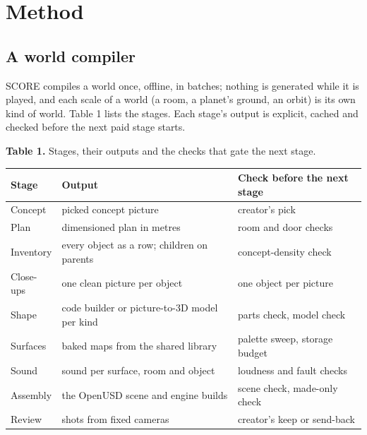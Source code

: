 \section{Method}\label{method}

\subsection{A world compiler}\label{a-world-compiler}

SCORE compiles a world once, offline, in batches; nothing is generated while it is played, and each scale of a world (a room, a planet's ground, an orbit) is its own kind of world. Table 1 lists the stages. Each stage's output is explicit, cached and checked before the next paid stage starts.

\textbf{Table 1.} Stages, their outputs and the checks that gate the next stage.

{\def\LTcaptype{none} %
\begin{longtable}[]{@{}
  >{\raggedright\arraybackslash}p{}
  >{\raggedright\arraybackslash}p{}
  >{\raggedright\arraybackslash}p{}@{}}
\toprule\noalign{}
\begin{minipage}[b]{\linewidth}\raggedright
Stage
\end{minipage} & \begin{minipage}[b]{\linewidth}\raggedright
Output
\end{minipage} & \begin{minipage}[b]{\linewidth}\raggedright
Check before the next stage
\end{minipage} \\
\midrule\noalign{}
\endhead
\bottomrule\noalign{}
\endlastfoot
Concept & picked concept picture & creator's pick \\
Plan & dimensioned plan in metres & room and door checks \\
Inventory & every object as a row; children on parents & concept-density check \\
Close-ups & one clean picture per object & one object per picture \\
Shape & code builder or picture-to-3D model per kind & parts check, model check \\
Surfaces & baked maps from the shared library & palette sweep, storage budget \\
Sound & sound per surface, room and object & loudness and fault checks \\
Assembly & the OpenUSD scene and engine builds & scene check, made-only check \\
Review & shots from fixed cameras & creator's keep or send-back \\
\end{longtable}
}

